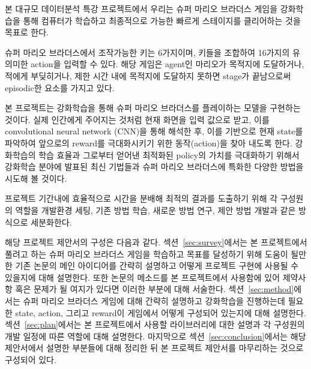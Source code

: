 본 대규모 데이터분석 특강 프로젝트에서 우리는 슈퍼 마리오 브라더스 게임을 강화학습을 통해 컴퓨터가 학습하고 최종적으로 가능한 빠르게 스테이지를 클리어하는 것을 목표로 한다.

슈퍼 마리오 브라더스에서 조작가능한 키는 6가지이며, 키들을 조합하여 16가지의 유의미한 action을 입력할 수 있다.
해당 게임은 agent인 마리오가 목적지에 도달하거나, 적에게 부딪히거나, 제한 시간 내에 목적지에 도달하지 못하면 stage가 끝남으로써 episodic한 요소를 가지고 있다. 

본 프로젝트는 강화학습을 통해 슈퍼 마리오 브라더스를 플레이하는 모델을 구현하는 것이다.
실제 인간에게 주어지는 것처럼 현재 화면을 입력 값으로 받고, 이를 convolutional neural network (CNN)을 통해 해석한 후, 이를 기반으로 현재 state를 파악하여 앞으로의 reward를 극대화시키기 위한 동작(action)을 찾아 내도록 한다.
강화학습의 학습 효율과 그로부터 얻어낸 최적화된 policy의 가치를 극대화하기 위해서 강화학습 분야에 발표된 최신 기법들과 슈퍼 마리오 브라더스에 특화한 다양한 방법을 시도해 볼 것이다.

프로젝트 기간내에 효율적으로 시간을 분배해 최적의 결과를 도출하기 위해 각 구성원의 역할을 개발환경 세팅, 기존 방법 학습, 새로운 방법 연구, 제안 방법 개발과 같은 방식으로 세분화한다.

해당 프로젝트 제안서의 구성은 다음과 같다. 
섹션~\ref{sec:survey}에서는 본 프로젝트에서 풀려고 하는 슈퍼 마리오 브라더스 게임을 학습하고 목표를 달성하기 위해 도움이 될만한 기존 논문의 메인 아이디어를 간략히 설명하고 어떻게 프로젝트 구현에 사용될 수 있을지에 대해 설명한다. 
또한 논문의 메소드를 본 프로젝트에서 사용함에 있어 제약사항 혹은 문제가 될 여지가 있다면 이러한 부분에 대해 서술한다. 
섹션~\ref{sec:method}에서는 슈퍼 마리오 브라더스 게임에 대해 간략히 설명하고 강화학습을 진행하는데 필요한 state, action, 그리고 reward이 게임에서 어떻게 구성되어 있는지에 대해 설명한다. 
섹션~\ref{sec:plan}에서는 본 프로젝트에서 사용할 라이브러리에 대한 설명과 각 구성원의 개발 일정에 따른 역할에 대해 설명한다. 
마지막으로 섹션~\ref{sec:conclusion}에서는 해당 제안서에서 설명한 부분들에 대해 정리한 뒤 본 프로젝트 제안서를 마무리하는 것으로 구성되어 있다.

